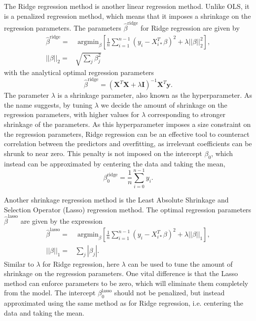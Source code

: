 \documentclass[a4paper, 10pt]{article}
\begin{document}
\begin{multicols}{2}
The Ridge regression method is another linear regression method. Unlike OLS, it is a penalized regression method, which means that it imposes a shrinkage on the regression parameters. The parameters $\hat{\beta}^\text{ridge}$ for Ridge regression are given by
\begin{align}
    \hat{\beta}^\text{ridge} = &\text{ argmin}_\beta \left[ \frac{1}{n}\sum_{i=1}^{n-1}(y_i-X_{i*}^T\beta)^2 + \lambda ||\beta||_2^2  \right],
    \label{eq:argminbeta_ridge}\\
        ||\beta||_2 =&  \sqrt{\sum_j \beta_j^2}
\end{align}
with the analytical optimal regression parameters
\begin{equation}
    \hat{\beta}^\text{ridge} = (\bm{X}^T\bm{X} +\lambda \bm{I})^{-1} \bm{X}^T \bm{y}.
    \label{eq:beta_ridge}
\end{equation}
The parameter $\lambda$ is a shrinkage parameter, also known as the hyperparameter. As the name suggests, by tuning $\lambda$ we decide the amount of shrinkage on the regression parameters, with higher values for $\lambda$ corresponding to stronger shrinkage of the parameters. As this hyperparameter imposes a size constraint on the regression parameters, Ridge regression can be an effective tool to counteract correlation between the predictors and overfitting, as irrelevant coefficients can be shrunk to near zero. This penalty is not imposed on the intercept $\beta_0$, which instead can be approximated by centering the data and taking the mean,
\begin{equation}
	\beta_0^\text{ridge}=\frac{1}{n}\sum_{i=0}^{n-1}y_i.
	\label{eq:beta0_Ridge}
\end{equation}

Another shrinkage regression method is the  Least Absolute Shrinkage and Selection Operator (Lasso) regression method. The optimal regression parameters $\hat{\beta}^\text{lasso}$ are  given by the expression
\begin{align}
    \hat{\beta}^\text{lasso} =&  \text{ argmin}_\beta \left[  \frac{1}{n}\sum_{i=1}^{n-1}(y_i-X_{i*}^T\beta)^2 + \lambda ||\beta||_1  \right],
    \label{eq:argminbeta_lasso}\\
    ||\beta||_1 =& \sum_j |\beta_j|.
\end{align}
Similar to $\lambda$ for Ridge regression, here $\lambda$ can be used to tune the amount of shrinkage on the regression parameters. One vital difference is that the Lasso method can enforce parameters to be zero, which will eliminate them completely from the model.  The intercept $\beta_0^\text{lasso}$ should not be penalized, but instead approximated using the same method as for Ridge regression, i.e. centering the data and taking the mean. 


\end{multicols}
\end{document}
